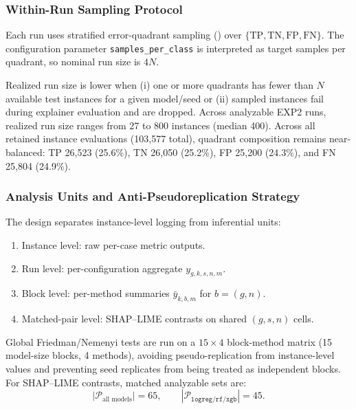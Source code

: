 \documentclass[twoside,11pt]{article}
\begin{document}
\subsubsection{Within-Run Sampling Protocol}
Each run uses stratified error-quadrant sampling
() over $\{\mathrm{TP},\mathrm{TN},\mathrm{FP},\mathrm{FN}\}$.
The configuration parameter \texttt{samples\_per\_class} is interpreted as
target samples per quadrant, so nominal run size is $4N$.

Realized run size is lower when (i) one or more quadrants has fewer than $N$
available test instances for a given model/seed or (ii) sampled instances fail
during explainer evaluation and are dropped. Across analyzable EXP2 runs,
realized run size ranges from 27 to 800 instances (median 400). Across all
retained instance evaluations (103,577 total), quadrant composition remains
near-balanced: TP 26,523 (25.6\%), TN 26,050 (25.2\%), FP 25,200 (24.3\%), and
FN 25,804 (24.9\%).

\subsubsection{Analysis Units and Anti-Pseudoreplication Strategy}
The design separates instance-level logging from inferential units:
\begin{enumerate}[leftmargin=*]
    \item Instance level: raw per-case metric outputs.
    \item Run level: per-configuration aggregate $y_{g,k,s,n,m}$.
    \item Block level: per-method summaries $\bar{y}_{k,b,m}$ for $b=(g,n)$.
    \item Matched-pair level: SHAP--LIME contrasts on shared $(g,s,n)$ cells.
\end{enumerate}

Global Friedman/Nemenyi tests are run on a $15\times4$ block-method matrix
(15 model-size blocks, 4 methods), avoiding pseudo-replication from
instance-level values and preventing seed replicates from being treated as
independent blocks. For SHAP--LIME contrasts, matched analyzable sets are:
\[
\left|\mathcal{P}_{\text{all models}}\right|=65,\qquad
\left|\mathcal{P}_{\texttt{logreg/rf/xgb}}\right|=45.
\]
\end{document}
